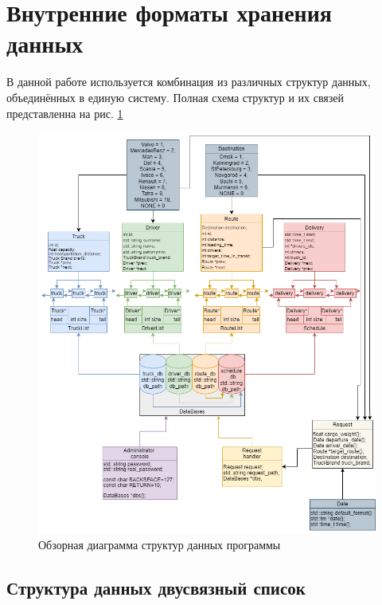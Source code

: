 \section{Внутренние форматы хранения данных}
\setcounter{figure}{0}


В данной работе используется комбинация из различных структур данных, 
объединённых в единую систему.
Полная схема структур и их связей представленна на рис. \ref{overall_data_structure} 

\begin{figure}[hpt!]
    \centering
    \includegraphics[width=1\linewidth]{photo/overall_data_structure}
    \caption{Обзорная диаграмма структур данных программы}
    \label{overall_data_structure}
\end{figure}

\newpage

\subsection{Структура данных двусвязный список}

